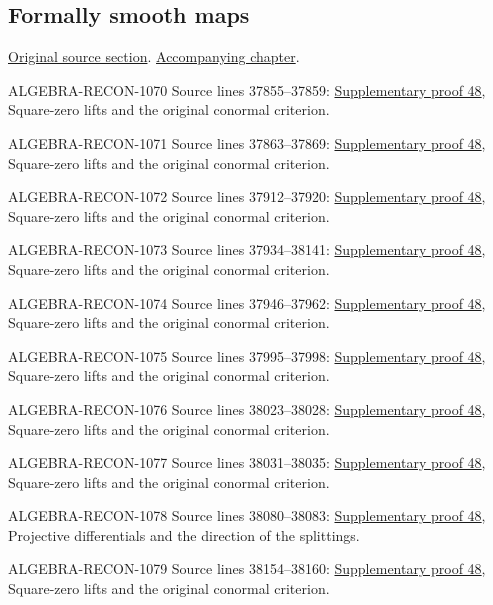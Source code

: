 \subsection{Formally smooth maps}
\hypertarget{algebra-source-section-formally-smooth}{}
\noindent\href{https://github.com/stacks/stacks-project/blob/a04446e57ec1fbc252a871afcec7752fb2807b14/algebra.tex\#L37795}{Original source section}. \href{algebra.pdf\#nameddest=section-formally-smooth}{Accompanying chapter}.

\begin{AlgebraSourceRoutes}
\item[ALGEBRA-RECON-1070] Source lines 37855--37859: \hyperlink{algebra_formal_smooth_notes_20260928}{Supplementary proof 48}, Square-zero lifts and the original conormal criterion.
\item[ALGEBRA-RECON-1071] Source lines 37863--37869: \hyperlink{algebra_formal_smooth_notes_20260928}{Supplementary proof 48}, Square-zero lifts and the original conormal criterion.
\item[ALGEBRA-RECON-1072] Source lines 37912--37920: \hyperlink{algebra_formal_smooth_notes_20260928}{Supplementary proof 48}, Square-zero lifts and the original conormal criterion.
\item[ALGEBRA-RECON-1073] Source lines 37934--38141: \hyperlink{algebra_formal_smooth_notes_20260928}{Supplementary proof 48}, Square-zero lifts and the original conormal criterion.
\item[ALGEBRA-RECON-1074] Source lines 37946--37962: \hyperlink{algebra_formal_smooth_notes_20260928}{Supplementary proof 48}, Square-zero lifts and the original conormal criterion.
\item[ALGEBRA-RECON-1075] Source lines 37995--37998: \hyperlink{algebra_formal_smooth_notes_20260928}{Supplementary proof 48}, Square-zero lifts and the original conormal criterion.
\item[ALGEBRA-RECON-1076] Source lines 38023--38028: \hyperlink{algebra_formal_smooth_notes_20260928}{Supplementary proof 48}, Square-zero lifts and the original conormal criterion.
\item[ALGEBRA-RECON-1077] Source lines 38031--38035: \hyperlink{algebra_formal_smooth_notes_20260928}{Supplementary proof 48}, Square-zero lifts and the original conormal criterion.
\item[ALGEBRA-RECON-1078] Source lines 38080--38083: \hyperlink{algebra_formal_smooth_notes_20260928}{Supplementary proof 48}, Projective differentials and the direction of the splittings.
\item[ALGEBRA-RECON-1079] Source lines 38154--38160: \hyperlink{algebra_formal_smooth_notes_20260928}{Supplementary proof 48}, Square-zero lifts and the original conormal criterion.

\end{AlgebraSourceRoutes}
